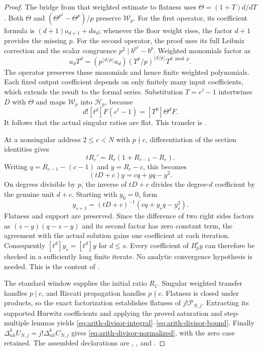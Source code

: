 \begin{proof}
The bridge from that weighted estimate to flatness uses
$\Theta=(1+T)d/dT$.  Both $\Theta$ and
$(\Theta^{p^2}-\Theta^p)/p$ preserve $\mathcal W_p$.
For the first operator, its coefficient formula is
$(d+1)a_{d+1}+da_d$; whenever the floor weight rises, the factor $d+1$
provides the missing $p$.  For the second operator, the proof uses its
full Leibniz correction and the scalar congruence
$p^2\mid b^{p^2}-b^p$.  Weighted monomials factor as
\[
 a_dT^d=(p^{\lfloor d/p\rfloor}a_d)
          (T^p/p)^{\lfloor d/p\rfloor}T^{d\bmod p}.
\]
The operator preserves these monomials and hence finite weighted
polynomials.  Each fixed output coefficient depends on only finitely many
input coefficients, which extends the result to the formal series.
Substitution $T=e^t-1$ intertwines $D$ with $\Theta$ and maps
$\mathcal W_p$ into $\mathcal H_p$, because
\[
 d![t^d]F(e^t-1)=[T^0]\Theta^dF.
\]
It follows that the actual singular ratios are flat.  This transfer is
.

At a nonsingular address $2\le c<N$ with $p\nmid c$, differentiation of the section
identities gives
\[
 tR_c'=R_c(1+R_{c-1}-R_c).
\]
Writing $q=R_{c-1}-(c-1)$ and $y=R_c-c$, this becomes
\[
 (tD+c)y=cq+yq-y^2.
\]
On degrees divisible by $p$, the inverse of $tD+c$ divides the degree-$d$
coefficient by the genuine unit $d+c$.  Starting with $y_0=0$, form
\[
 y_{s+1}=(tD+c)^{-1}(cq+y_sq-y_s^2).
\]
Flatness and support are preserved.  Since the difference of two right
sides factors as $(z-y)(q-z-y)$ and its second factor has zero constant
term, the agreement with the actual solution gains one coefficient at
each iteration.  Consequently $[t^d]y_s=[t^d]y$ for $d\le s$.
Every coefficient of $B_p^r y$ can therefore be checked in a sufficiently
long finite iterate.  No analytic convergence hypothesis is needed.
This is the content of
.

The standard window supplies the initial ratio $R_1$.  Singular weighted transfer
handles $p\mid c$, and Riccati propagation handles $p\nmid c$.
Flatness is closed under products, so the exact factorization establishes
flatness of $j!\mathcal P_{N,j}$.  Extracting its supported Hurwitz coefficients
and applying the proved saturation and step-multiple lemmas yields
\eqref{eq:arith-divisor-integral}--\eqref{eq:arith-divisor-bound}.
Finally $\Delta_{uh}^kU_{N,j}=j!\Delta_{uh}^kC_{N,j}$ gives
\eqref{eq:arith-divisor-normalized}, with the zero case retained.
The assembled declarations are
,
, and
.
\end{proof}

